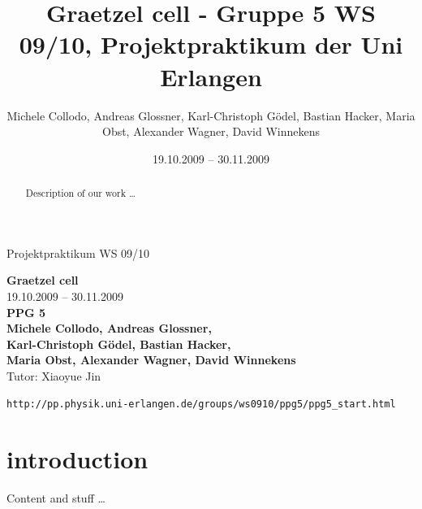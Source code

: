 \documentclass[11pt]{scrartcl}
\title{Graetzel cell - Gruppe 5 WS 09/10, Projektpraktikum der Uni Erlangen}
\date{19.10.2009 -- 30.11.2009}
\author{Michele Collodo, Andreas Glossner, Karl-Christoph Gödel, Bastian Hacker, Maria Obst, Alexander Wagner, David Winnekens}
\begin{document}
\sloppy %
\thispagestyle{empty}
\large{Projektpraktikum WS 09/10}
\hfill
{}
\\[8\baselineskip]
\begin{center}
\Huge{\textbf{Graetzel cell}}\\[0.5\baselineskip]
\Large{19.10.2009 -- 30.11.2009}
\\[6\baselineskip]
\Huge{\textbf{PPG 5}}\\[0.5\baselineskip]
\large{\textbf{Michele Collodo, Andreas Glossner,\\
Karl-Christoph Gödel, Bastian Hacker,\\
Maria Obst, Alexander Wagner, David Winnekens}\\
Tutor: Xiaoyue Jin}
\vfill



\small{\texttt{http://pp.physik.uni-erlangen.de/groups/ws0910/ppg5/ppg5\_start.html}}
\end{center}
\newpage



\tableofcontents
\vfill



\begin{abstract}
Description of our work \ldots
\end{abstract}
\newpage



\section{introduction}
Content and stuff \ldots
\end{document}
